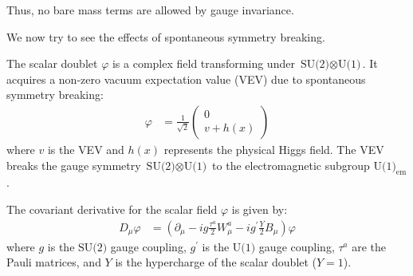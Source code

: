 Thus, no bare mass terms are allowed by gauge invariance.

We now try to see the effects of spontaneous symmetry breaking.

The scalar doublet $\varphi$ is a complex field transforming under $\text{SU(2)} \otimes \text{U(1)}$. It acquires a non-zero vacuum expectation value (VEV) due to spontaneous symmetry breaking:
\begin{align}
    \varphi &= \frac{1}{\sqrt{2}} \begin{pmatrix} 0 \\ v + h(x) \end{pmatrix}
\end{align}
where $v$ is the VEV and $h(x)$ represents the physical Higgs field. The VEV breaks the gauge symmetry $\text{SU(2)} \otimes \text{U(1)}$ to the electromagnetic subgroup $\text{U(1)}_{\text{em}}$.

The covariant derivative for the scalar field $\varphi$ is given by:
\begin{align}
    D_\mu \varphi &= \left( \partial_\mu - i g \frac{\tau^a}{2} W_\mu^a - i g^\prime \frac{Y}{2} B_\mu \right) \varphi
\end{align}
where $g$ is the $\text{SU(2)}$ gauge coupling, $g^\prime $ is the $\text{U(1)}$ gauge coupling, $\tau^a$ are the Pauli matrices, and $Y$ is the hypercharge of the scalar doublet ($Y = 1$). 

